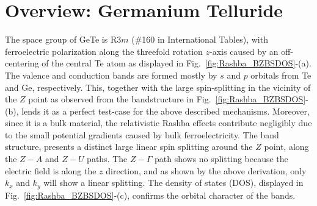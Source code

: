 \section{Overview: Germanium Telluride}
The space group of GeTe is R$3m$ (\#160 in International Tables), with ferroelectric polarization along the threefold rotation $z$-axis caused by an off-centering of the central Te atom \cite{Rabe1987} as displayed in Fig.~\ref{fig:Rashba_BZBSDOS}-(a). The valence and conduction bands are formed mostly by $s$ and $p$ orbitals from Te and Ge, respectively.
This, together with the large spin-splitting in the vicinity of the $Z$ point \cite{DiSante2013} as observed from the bandstructure in Fig.~\ref{fig:Rashba_BZBSDOS}-(b), lends it as a perfect test-case for the above described mechanisms. Moreover, since it is a bulk material, the relativistic Rashba effects contribute negligibly due to the small potential gradients caused by bulk ferroelectricity. The band structure,  presents a distinct large linear spin splitting around the $Z$ point, along the $Z-A$ and $Z-U$ paths. The $Z-\Gamma$ path shows no splitting because the electric field is along the $z$ direction, and as shown by the above derivation, only $k_x$ and $k_y$ will show a linear splitting.
The density of states (DOS), displayed in Fig.~\ref{fig:Rashba_BZBSDOS}-(c), confirms the orbital character of the bands.
